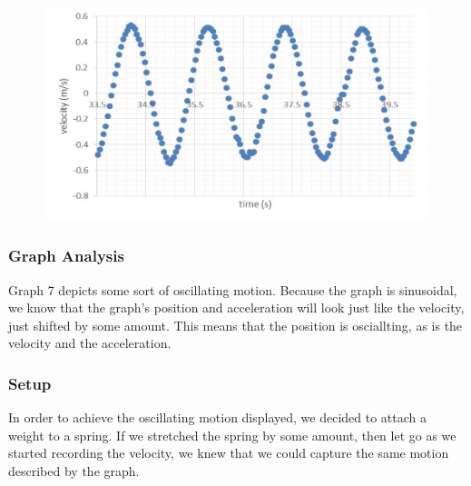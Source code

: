 \documentclass[11pt, letterpaper, includehead]{article}
\begin{document}
  \begin{figure}[H] %
    \centering 
    \includegraphics[width=\linewidth]{graph_7.png}
  \end{figure}

  \subsubsection{Graph Analysis}
  Graph 7 depicts some sort of oscillating motion. Because the graph is 
  sinusoidal, we know that the graph's position and acceleration will look
  just like the velocity, just shifted by some amount. This means that the 
  position is osciallting, as is the velocity and the acceleration.
  \subsubsection{Setup}
  In order to achieve the oscillating motion displayed, we decided to attach
  a weight to a spring. If we stretched the spring by some amount, then
  let go as we started recording the velocity, we knew that we could capture
  the same motion described by the graph.





\end{document}
